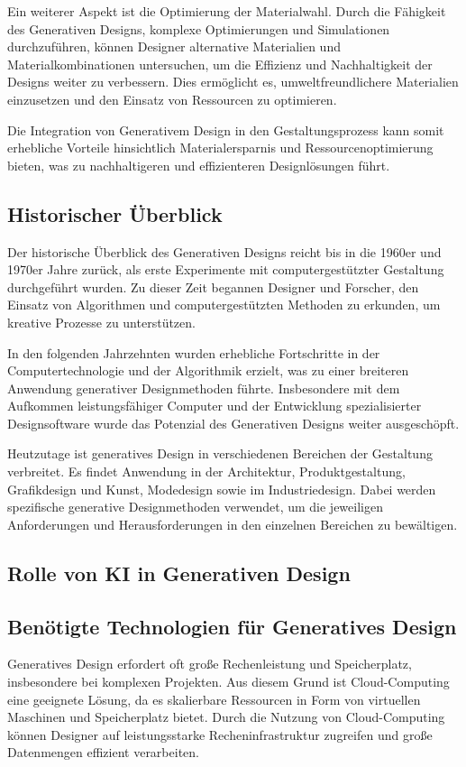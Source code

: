 Ein weiterer Aspekt ist die Optimierung der Materialwahl. Durch die Fähigkeit des Generativen Designs, komplexe Optimierungen und Simulationen durchzuführen, können Designer alternative Materialien und Materialkombinationen untersuchen, um die Effizienz und Nachhaltigkeit der Designs weiter zu verbessern. Dies ermöglicht es, umweltfreundlichere Materialien einzusetzen und den Einsatz von Ressourcen zu optimieren.

Die Integration von Generativem Design in den Gestaltungsprozess kann somit erhebliche Vorteile hinsichtlich Materialersparnis und Ressourcenoptimierung bieten, was zu nachhaltigeren und effizienteren Designlösungen führt. \autocite*{20}

\subsection*{Historischer Überblick}
Der historische Überblick des Generativen Designs reicht bis in die 1960er und 1970er Jahre zurück, als erste Experimente mit computergestützter Gestaltung durchgeführt wurden. Zu dieser Zeit begannen Designer und Forscher, den Einsatz von Algorithmen und computergestützten Methoden zu erkunden, um kreative Prozesse zu unterstützen.

In den folgenden Jahrzehnten wurden erhebliche Fortschritte in der Computertechnologie und der Algorithmik erzielt, was zu einer breiteren Anwendung generativer Designmethoden führte. Insbesondere mit dem Aufkommen leistungsfähiger Computer und der Entwicklung spezialisierter Designsoftware wurde das Potenzial des Generativen Designs weiter ausgeschöpft.

Heutzutage ist generatives Design in verschiedenen Bereichen der Gestaltung verbreitet. Es findet Anwendung in der Architektur, Produktgestaltung, Grafikdesign und Kunst, Modedesign sowie im Industriedesign. Dabei werden spezifische generative Designmethoden verwendet, um die jeweiligen Anforderungen und Herausforderungen in den einzelnen Bereichen zu bewältigen. \autocite*{18}

\subsection*{Rolle von KI in Generativen Design}

\subsection*{Benötigte Technologien für Generatives Design}
Generatives Design erfordert oft große Rechenleistung und Speicherplatz, insbesondere bei komplexen Projekten. Aus diesem Grund ist Cloud-Computing eine geeignete Lösung, da es skalierbare Ressourcen in Form von virtuellen Maschinen und Speicherplatz bietet. Durch die Nutzung von Cloud-Computing können Designer auf leistungsstarke Recheninfrastruktur zugreifen und große Datenmengen effizient verarbeiten.

